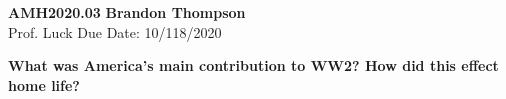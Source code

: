 \noindent
\textbf{AMH2020.03} \hfill \textbf{Brandon Thompson} \\
\normalsize Prof. Luck \hfill Due Date: 10/118/2020 \\

\begin{center}
\textbf{What was America's main contribution to WW2? How did this effect home life?}
\end{center}